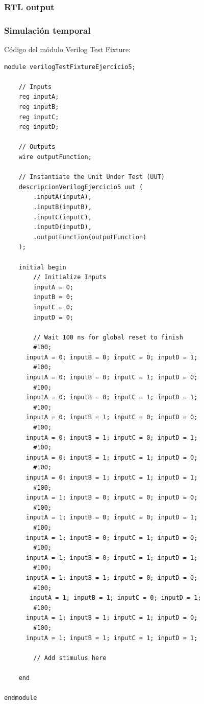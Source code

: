 \subsubsection{RTL output}\subsubsection{Simulación temporal}\noindent Código del módulo Verilog Test Fixture:\begin{lstlisting}
module verilogTestFixtureEjercicio5;

	// Inputs
	reg inputA;
	reg inputB;
	reg inputC;
	reg inputD;

	// Outputs
	wire outputFunction;

	// Instantiate the Unit Under Test (UUT)
	descripcionVerilogEjercicio5 uut (
		.inputA(inputA), 
		.inputB(inputB), 
		.inputC(inputC), 
		.inputD(inputD), 
		.outputFunction(outputFunction)
	);

	initial begin
		// Initialize Inputs
		inputA = 0;
		inputB = 0;
		inputC = 0;
		inputD = 0;

		// Wait 100 ns for global reset to finish
		#100;
      inputA = 0; inputB = 0; inputC = 0; inputD = 1;
		#100;
      inputA = 0; inputB = 0; inputC = 1; inputD = 0;
		#100;
      inputA = 0; inputB = 0; inputC = 1; inputD = 1;
		#100;
      inputA = 0; inputB = 1; inputC = 0; inputD = 0;
		#100;
      inputA = 0; inputB = 1; inputC = 0; inputD = 1;
		#100;
      inputA = 0; inputB = 1; inputC = 1; inputD = 0;
		#100;
      inputA = 0; inputB = 1; inputC = 1; inputD = 1;
		#100;
      inputA = 1; inputB = 0; inputC = 0; inputD = 0;
		#100;
      inputA = 1; inputB = 0; inputC = 0; inputD = 1;
		#100;
      inputA = 1; inputB = 0; inputC = 1; inputD = 0;
		#100;
      inputA = 1; inputB = 0; inputC = 1; inputD = 1;
		#100;
      inputA = 1; inputB = 1; inputC = 0; inputD = 0;
		#100;
	   inputA = 1; inputB = 1; inputC = 0; inputD = 1;
		#100;
      inputA = 1; inputB = 1; inputC = 1; inputD = 0;
		#100;
      inputA = 1; inputB = 1; inputC = 1; inputD = 1;

		// Add stimulus here

	end
      
endmodule\end{lstlisting}


